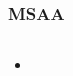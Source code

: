 \begin{frame}
\frametitle{MSAA}
\begin{columns}




\begin{itemize}
\item
\end{itemize}




\end{columns}
\end{frame}
